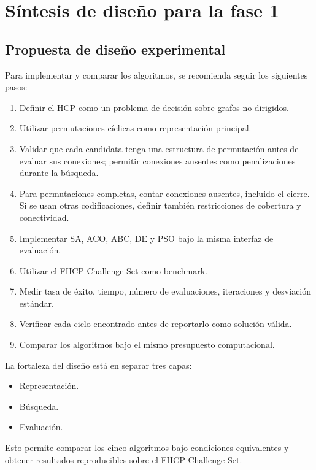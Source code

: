 \chapter{Síntesis de diseño para la fase 1}
\section{Propuesta de diseño experimental}

Para implementar y comparar los algoritmos, se recomienda seguir los siguientes pasos:

\begin{enumerate}
    \item Definir el HCP como un problema de decisión sobre grafos no dirigidos.
    \item Utilizar permutaciones cíclicas como representación principal.
    \item Validar que cada candidata tenga una estructura de permutación antes de evaluar sus conexiones; permitir conexiones ausentes como penalizaciones durante la búsqueda.
    \item Para permutaciones completas, contar conexiones ausentes, incluido el cierre. Si se usan otras codificaciones, definir también restricciones de cobertura y conectividad.
    \item Implementar SA, ACO, ABC, DE y PSO bajo la misma interfaz de evaluación.
    \item Utilizar el FHCP Challenge Set como benchmark.
    \item Medir tasa de éxito, tiempo, número de evaluaciones, iteraciones y desviación estándar.
    \item Verificar cada ciclo encontrado antes de reportarlo como solución válida.
    \item Comparar los algoritmos bajo el mismo presupuesto computacional.
\end{enumerate}

La fortaleza del diseño está en separar tres capas:

\begin{itemize}
    \item Representación.
    \item Búsqueda.
    \item Evaluación.
\end{itemize}

Esto permite comparar los cinco algoritmos bajo condiciones equivalentes y obtener resultados reproducibles sobre el FHCP Challenge Set. \cite{de2}


